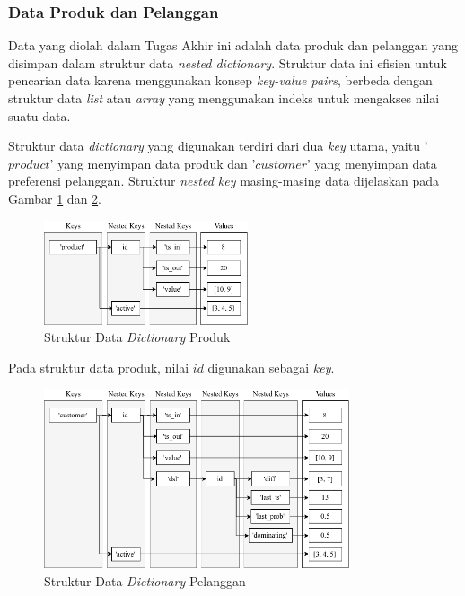 \subsubsection{Data Produk dan Pelanggan}

Data yang diolah dalam Tugas Akhir ini adalah data produk dan pelanggan yang disimpan dalam struktur data \textit{nested dictionary}. Struktur data ini efisien untuk pencarian data karena menggunakan konsep \textit{key-value pairs}, berbeda dengan struktur data \textit{list} atau \textit{array} yang menggunakan indeks untuk mengakses nilai suatu data.

Struktur data \textit{dictionary} yang digunakan terdiri dari dua \textit{key} utama, yaitu '$product$' yang menyimpan data produk dan '$customer$' yang menyimpan data preferensi pelanggan. Struktur \textit{nested key} masing-masing data dijelaskan pada Gambar \ref{fig:sd1} dan \ref{fig:sd2}.

\begin{figure}[h]
	\centering
	\includegraphics[width=6cm]{bab3/img/sd1.png}
	\caption{Struktur Data \textit{Dictionary} Produk}
	\label{fig:sd1}
\end{figure}

Pada struktur data produk, nilai $id$ digunakan sebagai \textit{key}.  

\begin{figure}[h]
	\centering
	\includegraphics[width=9cm]{bab3/img/sd2.png}
	\caption{Struktur Data \textit{Dictionary} Pelanggan}
	\label{fig:sd2}
\end{figure}

 

